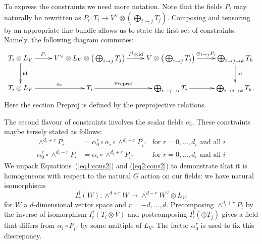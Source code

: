 \documentclass{amsart}
\theoremstyle{definition}
\begin{document}
To express the constraints we need more notation.
Note that the fields $P_i$ may naturally be rewritten as $P_i \colon T_i \rightarrow V^\vee \otimes (\bigoplus_{i \rightarrow j} T_j)$.
Composing and tensoring by an appropriate line bundle allows us to state the first set of constraints.
Namely, the following diagram commutes:
\begin{equation*}
    \xymatrix{T_i \otimes L_V \ar[r]^-{P_i} \ar[d]^{\text{id}} & V^\vee \otimes L_V \otimes \big(\bigoplus_{i \rightarrow j} T_j\big) \ar[r]^-{I^\dagger \otimes \text{id}} & V \otimes \big(\bigoplus_{i \rightarrow j} T_j\big) \ar[r]^-{\oplus_{i \rightarrow j} P_j} & \bigoplus_{i \rightarrow j \rightarrow k} T_k \ar[d]^{\text{id}} \\
    T_i \otimes L_V \ar[r]^-{\alpha_0} & T_i \ar[r]^-{\text{Preproj}} & \bigoplus_{i \rightarrow j \rightarrow i} T_i \ar[r] & \bigoplus_{i \rightarrow j \rightarrow k} T_k.
    }
\end{equation*}
Here the section $\text{Preproj}$ is defined by the preprojective relations.

The second flavour of constraints involves the scalar fields $\alpha_i$.
These constraints maybe tersely stated as follows:
\begin{align}
    \wedge^{d_i+r} P_i &= \alpha_0^r \circ \alpha_i \circ \wedge^{d_i-r} P_{i^\vee}   &\text{for} \,\, r =0,\ldots, d_i \text{ and all } i  \label{eq1:cons2} \\
    \alpha_0^r \circ \wedge^{d_i-r} P_i &= \alpha_i \circ \wedge^{d_i+r} P_{i^\vee} &\text{for} \,\, r=0,\ldots, d_i \text{ and all } i  \label{eq2:cons2} 
\end{align}
We unpack Equations~(\ref{eq1:cons2}) and (\ref{eq2:cons2}) to demonstrate that it is homogeneous with respect to the natural $G$ action on our fields: we have natural isomorphisms
$$I^\dagger_r(W) \colon \wedge^{d+r} W \rightarrow \wedge^{d-r} W^\vee \otimes L_W$$ for $W$ a $d$-dimensional vector space and $r= -d, \ldots, d$.
Precomposing $\wedge^{d_i+r} P_i$ by the inverse of isomorphism $I^{\dagger}_r(T_i \otimes V)$ and postcomposing $I^{\dagger}_r(\oplus T_j)$ gives a field that differs from $\alpha_i \circ P_{i^\vee}$ by some multiple of $L_V$.
The factor $\alpha_0^r$ is used to fix this discrepancy.
\end{document}
